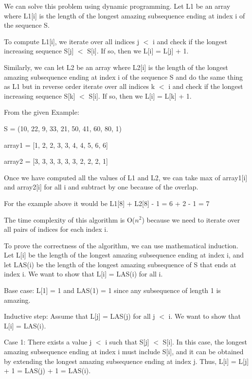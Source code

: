 \documentclass[12pt]{article}
\newenvironment{solution}{{\noindent\bf Solution:}}{\vspace{5mm}}
\begin{document}
\begin{solution}
      
      We can solve this problem using dynamic programming. 
      Let L1 be an array where L1[i] is the length of the longest amazing subsequence ending at index i of the sequence S.

      To compute L1[i], we iterate over all indices j $<$ i and check if the longest increasing sequence S[j] $<$ S[i]. If so, then we L[i] = L[j] + 1. 
      
      Similarly, we can let L2 be an array where L2[i] is the length of the longest amazing subsequence ending at index i of the sequence S
      and do the same thing as L1 but in reverse order 
      iterate over all indices k $<$ i and check if the longest increasing sequence S[k] $<$ S[i]. If so, then we L[i] = L[k] + 1.

      From the given Example:

      S = (10, 22, 9, 33, 21, 50, 41, 60, 80, 1)

      array1 = [1, 2, 2, 3, 3, 4, 4, 5, 6, 6]

      array2 = [3, 3, 3, 3, 3, 3, 2, 2, 2, 1]

      Once we have computed all the values of L1 and L2, we can take max of array1[i] and array2[i] for all i and subtract by one because of the overlap.

      For the example above it would be L1[8] + L2[8] - 1 = 6 + 2 - 1 = 7
      
      The time complexity of this algorithm is O($n^2$) because we need to iterate over all pairs of indices for each index i.
      
      To prove the correctness of the algorithm, we can use mathematical induction. Let L[i] be the length of the longest amazing subsequence ending at index i, and let LAS(i) be the length of the longest amazing subsequence of S that ends at index i. We want to show that L[i] = LAS(i) for all i.
      
      Base case: L[1] = 1 and LAS(1) = 1 since any subsequence of length 1 is amazing.
      
      Inductive step: Assume that L[j] = LAS(j) for all j $<$ i. We want to show that L[i] = LAS(i).
      
      Case 1: There exists a value j $<$ i such that S[j] $<$ S[i]. In this case, the longest amazing subsequence ending at index i must include S[i], and it can be obtained by extending the longest amazing subsequence ending at index j. Thus, L[i] = L[j] + 1 = LAS(j) + 1 = LAS(i).
      

\end{solution}
\end{document}
